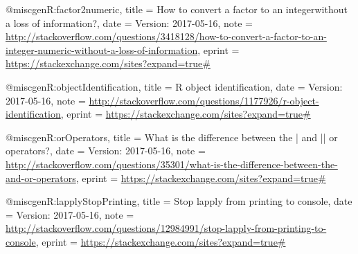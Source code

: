 @misc{genR:factor2numeric,
title = {{How to convert a factor to an integer\numeric without a loss of information?}},
date = {Version: 2017-05-16},
note = {\url{http://stackoverflow.com/questions/3418128/how-to-convert-a-factor-to-an-integer-numeric-without-a-loss-of-information}},
eprint = {\url{https://stackexchange.com/sites?expand=true#}}}

@misc{genR:objectIdentification,
title = {{R object identification}},
date = {Version: 2017-05-16},
note = {\url{http://stackoverflow.com/questions/1177926/r-object-identification}},
eprint = {\url{https://stackexchange.com/sites?expand=true#}}}

@misc{genR:orOperators,
title = {{What is the difference between the | and || or operators?}},
date = {Version: 2017-05-16},
note = {\url{http://stackoverflow.com/questions/35301/what-is-the-difference-between-the-and-or-operators}},
eprint = {\url{https://stackexchange.com/sites?expand=true#}}}

@misc{genR:lapplyStopPrinting,
title = {{Stop lapply from printing to console}},
date = {Version: 2017-05-16},
note = {\url{http://stackoverflow.com/questions/12984991/stop-lapply-from-printing-to-console}},
eprint = {\url{https://stackexchange.com/sites?expand=true#}}}